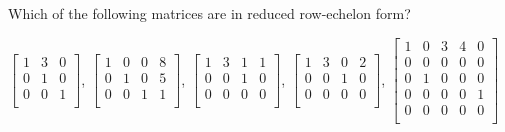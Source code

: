 \documentclass[11pt]{exam}
\begin{document}
\begin{questions}

\addpoints
\question[20]

Which of the following matrices are in reduced row-echelon form?

$
\begin{bmatrix}
1 & 3 & 0 \\
0 & 1 & 0 \\
0 & 0 & 1 \\
\end{bmatrix}
$,
$
\begin{bmatrix}
1 & 0 & 0 & 8\\
0 & 1 & 0 & 5\\
0 & 0 & 1 & 1\\
\end{bmatrix}
$,
$
\begin{bmatrix}
1 & 3 & 1 & 1\\
0 & 0 & 1 & 0\\
0 & 0 & 0 & 0\\
\end{bmatrix}
$,
$
\begin{bmatrix}
1 & 3 & 0 & 2\\
0 & 0 & 1 & 0\\
0 & 0 & 0 & 0\\
\end{bmatrix}
$,
$
\begin{bmatrix}
1 & 0 & 3 & 4 & 0\\
0 & 0 & 0 & 0 & 0\\
0 & 1 & 0 & 0 & 0\\
0 & 0 & 0 & 0 & 1\\
0 & 0 & 0 & 0 & 0\\
\end{bmatrix}
$

\newpage
\addpoints
\question
{}
\end{questions}
\end{document}
